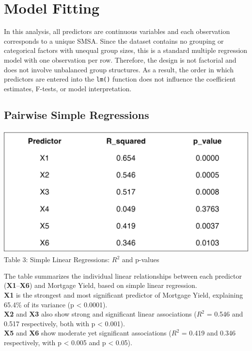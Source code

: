 \documentclass[
  11pt,
]{article}
\begin{document}
\section{Model Fitting}\label{model-fitting}

In this analysis, all predictors are continuous variables and each
observation corresponds to a unique SMSA. Since the dataset contains no
grouping or categorical factors with unequal group sizes, this is a
standard multiple regression model with one observation per row.
Therefore, the design is not factorial and does not involve unbalanced
group structures. As a result, the order in which predictors are entered
into the \texttt{lm()} function does not influence the coefficient
estimates, F-tests, or model interpretation.

\subsection{Pairwise Simple
Regressions}\label{pairwise-simple-regressions}

\begin{minipage}{0.5\textwidth}
\includegraphics[width=\linewidth]{simple_regression_table.png}\\
\small Table 3: Simple Linear Regressions: $R^2$ and p-values
\end{minipage}
\hspace{1em}
\begin{minipage}{0.52\textwidth}
\small
The table summarizes the individual linear relationships between each predictor (\textbf{X1}–\textbf{X6}) and Mortgage Yield, based on simple linear regression.\\
\textbf{X1} is the strongest and most significant predictor of Mortgage Yield, explaining 65.4\% of its variance (p < 0.0001). \\
\textbf{X2} and \textbf{X3} also show strong and significant linear associations ($R^2$ = 0.546 and 0.517 respectively, both with p < 0.001).\\
\textbf{X5} and \textbf{X6} show moderate yet significant associations ($R^2$ = 0.419 and 0.346 respectively, with p < 0.005 and p < 0.05).
\end{minipage}
\addtocounter{table}{1}
\end{document}

